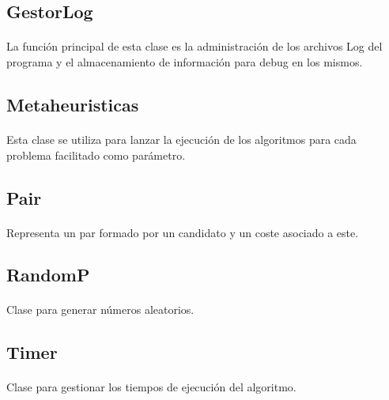 \documentclass{article}
\begin{document}
	\subsection{GestorLog}
	
	\paragraph{}La función principal de esta clase es la administración de los archivos Log del programa y el almacenamiento de información para debug en los mismos.
	
	\subsection{Metaheuristicas}
	
	\paragraph{}Esta clase se utiliza para lanzar la ejecución de los algoritmos para cada problema facilitado como parámetro.
	
	\subsection{Pair}
	
	\paragraph{}Representa un par formado por un candidato y un coste asociado a este.
	
	\subsection{RandomP}
	
	\paragraph{}Clase para generar números aleatorios.
	
	\subsection{Timer}
	
	\paragraph{}Clase para gestionar los tiempos de ejecución del algoritmo.
	
\end{document}
